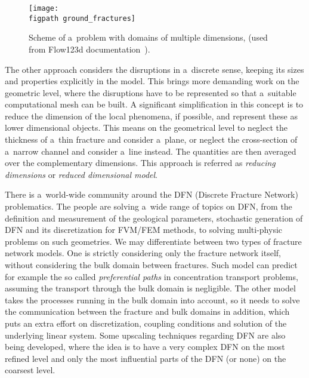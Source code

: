\begin{figure}[h]
\centering
\texttt{[image: \\figpath ground\_fractures]}
\caption{
    \label{fig:multi-dim}
    Scheme of a~problem with domains of multiple dimensions, (used from Flow123d documentation~\cite{flow123d_doc_2015}).
}
\end{figure}

% 

The other approach considers the disruptions in a~discrete sense, keeping its sizes and properties explicitly in the model.
This brings more demanding work on the geometric level, where the disruptions have to be represented so that a~suitable computational mesh can be built.
A significant simplification in this concept is to reduce the dimension of the local phenomena, if possible,
and represent these as lower dimensional objects. This means on the geometrical level to neglect the thickness of a~thin fracture and consider a~plane, or
neglect the cross-section of a~narrow channel and consider a~line instead. The quantities are then averaged over the complementary dimensions.
This approach is referred as \emph{reducing dimensions} or \emph{reduced dimensional model}.



There is a~world-wide community around the DFN (Discrete Fracture Network) problematics. The people are solving a~wide range of topics on DFN,
from the definition and measurement of the geological parameters, stochastic generation of DFN and its discretization for FVM/FEM methods,
to solving multi-physic problems on such geometries. We may differentiate between two types of fracture network models. One is strictly considering only
the fracture network itself, without considering the bulk domain between fractures. Such model can predict for example the so called \emph{preferential paths}
in concentration transport problems, assuming the transport through the bulk domain is negligible. The other model takes the processes running in the bulk domain
into account, so it needs to solve the communication between the fracture and bulk domains in addition, which puts an extra effort on discretization,
coupling conditions and solution of the underlying linear system.
Some upscaling techniques regarding DFN are also being developed, where the idea is to have a very complex DFN on the most refined level and only the most influential
parts of the DFN (or none) on the coarsest level.

